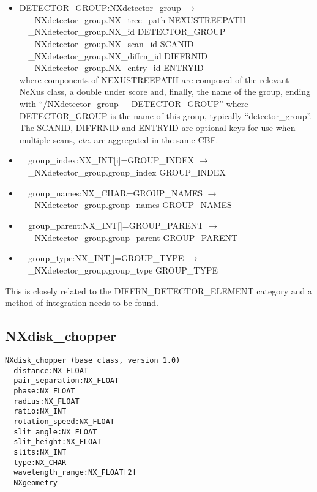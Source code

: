 \documentclass[11pt]{article}
\begin{document}
{{\begin{itemize}
\item{DETECTOR\_GROUP:NXdetector\_group $\rightarrow$\\
\verb|  |\_NXdetector\_group.NX\_tree\_path    NEXUSTREEPATH \\
\verb|  |\_NXdetector\_group.NX\_id            DETECTOR\_GROUP\\
\verb|  |\_NXdetector\_group.NX\_scan\_id      SCANID \\
\verb|  |\_NXdetector\_group.NX\_diffrn\_id    DIFFRNID \\
\verb|  |\_NXdetector\_group.NX\_entry\_id     ENTRYID \\
where components of NEXUSTREEPATH are composed of the
relevant NeXus class, a double under score and, finally, the
name of the group, ending with ``/NXdetector\_group\_\_DETECTOR\_GROUP''
where DETECTOR\_GROUP is the name of this group, typically ``detector\_group''.
The SCANID, DIFFRNID and ENTRYID are optional keys for use
when multiple scans, {\it etc.} are aggregated in the same CBF.}

\item{\verb|  |group\_index:NX\_INT[i]=GROUP\_INDEX $\rightarrow$\\
\verb|  |\_NXdetector\_group.group\_index GROUP\_INDEX}

\item{\verb|  |group\_names:NX\_CHAR=GROUP\_NAMES $\rightarrow$\\
\verb|  |\_NXdetector\_group.group\_names GROUP\_NAMES}

\item{\verb|  |group\_parent:NX\_INT[]=GROUP\_PARENT $\rightarrow$\\
\verb|  |\_NXdetector\_group.group\_parent GROUP\_PARENT}

\item{\verb|  |group\_type:NX\_INT[]=GROUP\_TYPE $\rightarrow$\\
\verb|  |\_NXdetector\_group.group\_type GROUP\_TYPE}
\end{itemize}

This is closely related to the DIFFRN\_DETECTOR\_ELEMENT category and
a method of integration needs to be found.

\subsection{NXdisk\_chopper}

\begin{verbatim}
NXdisk_chopper (base class, version 1.0)
  distance:NX_FLOAT
  pair_separation:NX_FLOAT
  phase:NX_FLOAT
  radius:NX_FLOAT
  ratio:NX_INT
  rotation_speed:NX_FLOAT
  slit_angle:NX_FLOAT
  slit_height:NX_FLOAT
  slits:NX_INT
  type:NX_CHAR
  wavelength_range:NX_FLOAT[2]
  NXgeometry
\end{verbatim}

}}
\end{document}
